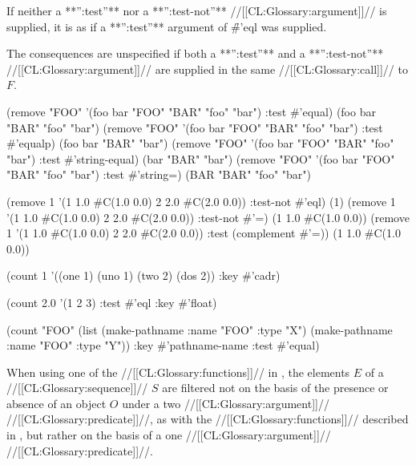 If neither a **'':test''** nor a **'':test-not''** //[[CL:Glossary:argument]]// is supplied, 
it is as if a **'':test''** argument of \f{\#'eql} was supplied.

The consequences are unspecified if both a **'':test''** and a **'':test-not''** //[[CL:Glossary:argument]]//
are supplied in the same //[[CL:Glossary:call]]// to $F$.


\code
 (remove "FOO" '(foo bar "FOO" "BAR" "foo" "bar") :test #'equal)
\EV (foo bar "BAR" "foo" "bar")
 (remove "FOO" '(foo bar "FOO" "BAR" "foo" "bar") :test #'equalp)
\EV (foo bar "BAR" "bar")
 (remove "FOO" '(foo bar "FOO" "BAR" "foo" "bar") :test #'string-equal)
\EV (bar "BAR" "bar")
 (remove "FOO" '(foo bar "FOO" "BAR" "foo" "bar") :test #'string=)
\EV (BAR "BAR" "foo" "bar")

 (remove 1 '(1 1.0 #C(1.0 0.0) 2 2.0 #C(2.0 0.0)) :test-not #'eql)
\EV (1)
 (remove 1 '(1 1.0 #C(1.0 0.0) 2 2.0 #C(2.0 0.0)) :test-not #'=)
\EV (1 1.0 #C(1.0 0.0))
 (remove 1 '(1 1.0 #C(1.0 0.0) 2 2.0 #C(2.0 0.0)) :test (complement #'=))
\EV (1 1.0 #C(1.0 0.0))

 (count 1 '((one 1) (uno 1) (two 2) (dos 2)) :key #'cadr) 

 (count 2.0 '(1 2 3) :test #'eql :key #'float) 

 (count "FOO" (list (make-pathname :name "FOO" :type "X")  
                    (make-pathname :name "FOO" :type "Y"))
        :key #'pathname-name
        :test #'equal)
\endcode

\endsubsubsection%

\endsubsection%


When using one of the //[[CL:Glossary:functions]]// in \thenextfigure,
the elements $E$ of a //[[CL:Glossary:sequence]]// $S$ are filtered
not on the basis of the presence or absence of an object $O$ 
under a two //[[CL:Glossary:argument]]// //[[CL:Glossary:predicate]]//,
as with the //[[CL:Glossary:functions]]// described in \secref\SatisfyingTheTwoArgTest,
but rather on the basis of a one //[[CL:Glossary:argument]]// //[[CL:Glossary:predicate]]//.



